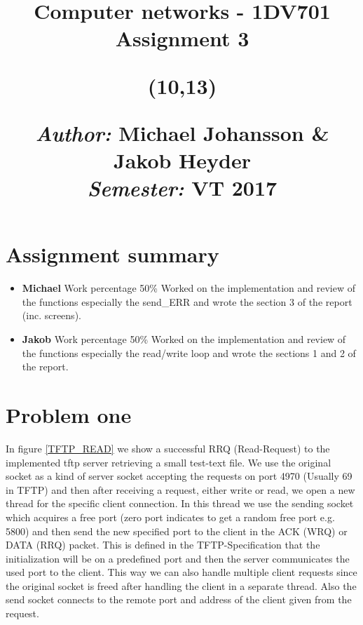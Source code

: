 \documentclass[a4paper,12pt]{article}
\title{	
\vspace{-8cm}
\begin{sidebar}
    \vspace{10cm}
    \normalfont \normalsize
    \vspace{-1.3cm}
\end{sidebar}
\vspace{3cm}
\begin{flushleft}
    \huge Computer networks - 1DV701 \\ 
    \LARGE  Assignment 3\\
\end{flushleft}
\null
\vfill
\begin{textblock}{6}(10,13)
\begin{flushright}
\begin{minipage}{\textwidth}
\begin{flushleft} \large
\emph{Author:} Michael Johansson \& Jakob Heyder\\ %
\emph{Semester:} VT 2017\\ %
\end{flushleft}
\end{minipage}
\end{flushright}
\end{textblock}
}
\date{}
\numberwithin{figure}{section}
\begin{document}
\maketitle
\clearpage


\newpage
{}
\tableofcontents %
\newpage
{}

%
%

\section{Assignment summary}

\begin{itemize}
\item\textbf{Michael}
Work percentage 50\% Worked on the implementation and review of the functions especially the send\_ERR and wrote the section 3 of the report (inc. screens).

\item\textbf{Jakob} 
Work percentage 50\% Worked on the implementation and review of the functions especially the read/write loop and wrote the sections 1 and 2 of the report.
\end{itemize}



\newpage

\section{Problem one}

In figure \ref{TFTP_READ} we show a successful RRQ (Read-Request) to the implemented tftp server retrieving a small test-text file.
\newline \noindent
We use the original socket as a kind of server socket accepting the requests on port 4970 (Usually 69 in TFTP) and then after receiving a request, either write or read, we open a new thread for the specific client connection. In this thread we use the sending socket which acquires a free port (zero port indicates to get a random free port e.g. 5800) and then send the new specified port to the client in the ACK (WRQ) or DATA (RRQ) packet.  This is defined in the TFTP-Specification that the initialization will be on a predefined port and then the server communicates the used port to the client. This way we can also handle multiple client requests since the original socket is freed after handling the client in a separate thread. Also the send socket connects to the remote port and address of the client given from the request.
\end{document}
